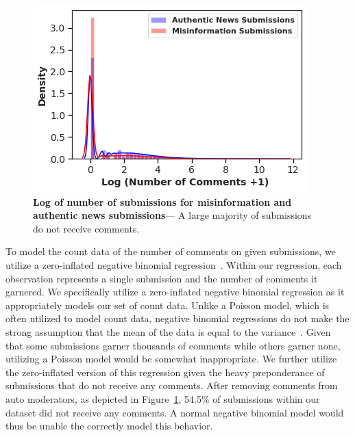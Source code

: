 \begin{figure}
\begin{minipage}[l]{0.4\textwidth}
\includegraphics[width=1\columnwidth]{figures/num_submissions.png} 
\end{minipage}
\begin{minipage}[l]{0.35\textwidth}
\caption{\textbf{Log of number of submissions for misinformation and authentic news submissions}--- A large majority of submissions do not receive  comments.\label{fig:num_comments}}
\end{minipage}

\end{figure}


To model the count data of the number of comments on given submissions, we utilize a zero-inflated negative binomial regression~\cite{ridout2001score}. Within our regression, each observation represents a single submission and the number of comments it garnered. We specifically utilize a zero-inflated negative binomial regression as it appropriately models our set of count data. Unlike a Poisson model, which is often utilized to model count data, negative binomial regressions do not make the strong assumption that the mean of the data is equal to the variance~\cite{morina2022web}. Given that some submissions garner thousands of comments while others garner none, utilizing a Poisson model would be somewhat inappropriate. We further utilize the zero-inflated version of this regression given the heavy preponderance of submissions that do not receive any comments. After removing comments from auto moderators, as depicted in Figure~\ref{fig:num_comments}, 54.5\% of submissions within our dataset did not receive any comments. A normal negative binomial model would thus be unable the correctly model this behavior. 


